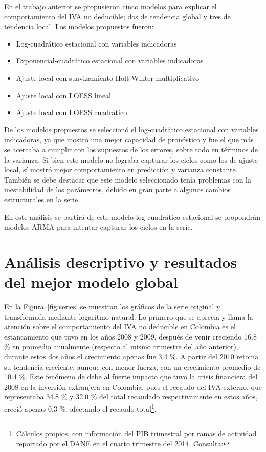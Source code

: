 \documentclass[11pt, letterpaper, twoside]{article}
\begin{document}
En el trabajo anterior se propusieron cinco modelos para explicar el comportamiento del IVA no deducible; dos de tendencia global y tres de tendencia local. Los modelos propuestos fueron:

\begin{itemize}
    \item Log-cuadrático estacional con variables indicadoras
    \item Exponencial-cuadrático estacional con variables indicadoras
    \item Ajuste local con suavizamiento Holt-Winter multiplicativo
    \item Ajuste local con LOESS lineal
    \item Ajuste local con LOESS cuadrático
\end{itemize}

De los modelos propuestos se seleccionó el log-cuadrático estacional con variables indicadoras, ya que mostró una mejor capacidad de pronóstico y fue el que más se acercaba a cumplir con los supuestos de los errores, sobre todo en términos de la varianza. Si bien este modelo no lograba capturar los ciclos como los de ajuste local, sí mostró mejor comportamiento en predicción y varianza constante. También se debe destacar que este modelo seleccionado tenía problemas con la inestabilidad de los parámetros, debido en gran parte a algunos cambios estructurales en la serie.

En este análisis se partirá de este modelo log-cuadrático estacional se propondrán modelos ARMA para intentar capturar los ciclos en la serie.



\section{Análisis descriptivo y resultados del mejor modelo global}

En la Figura~\ref{fig:series} se muestran los gráficos de la serie original y transformada mediante logaritmo natural. Lo primero que se aprecia y llama la atención sobre el comportamiento del IVA no deducible en Colombia es el estancamiento que tuvo en los años 2008 y 2009, después de venir creciendo 16.8 \% en promedio anualmente (respecto al mismo trimestre del año anterior), durante estos dos años el crecimiento apenas fue 3.4 \%. A partir del 2010  retoma su tendencia creciente, aunque con menor fuerza, con un crecimiento promedio de 10.4 \%. Este fenómeno de debe al fuerte impacto que tuvo la crisis financiera del 2008 en la inversión extranjera en Colombia, pues el recaudo del IVA externo, que representaba 34.8 \% y 32.0 \% del total recaudado respectivamente en estos años, creció apenas 0.3 \%, afectando el recaudo total\footnote{Cálculos propios, con información del PIB trimestral por ramas de actividad reportado por el DANE en el cuarto trimestre del 2014. Consulta: }.
\end{document}
